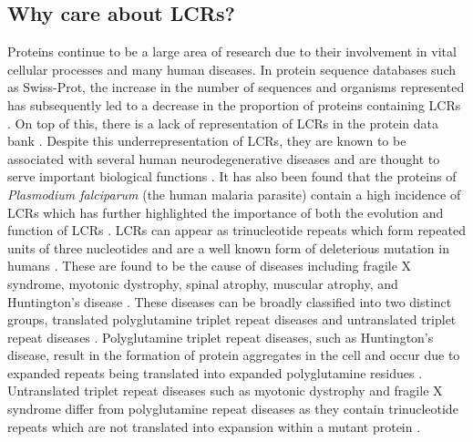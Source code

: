 \documentclass[10pt]{article}
\begin{document}
\subsection{Why care about LCRs?}
Proteins continue to be a large area of research due to their involvement in vital cellular processes and many human
diseases. In protein sequence databases such as Swiss-Prot, the increase in the number of sequences and organisms represented
has subsequently led to a decrease in the proportion of proteins containing LCRs \citep{coletta2010low}. On top of this, there
is a lack of representation of LCRs in the protein data bank \citep{huntley2002simple}. Despite this underrepresentation
of LCRs, they are known to be associated with several human neurodegenerative diseases and are thought to serve important
biological functions \citep{huntley2006selection, coletta2010low}. It has also been found that the proteins of \textit{Plasmodium
falciparum} (the human malaria parasite) contain a high incidence of LCRs which has further highlighted the importance of both
the evolution and function of LCRs \citep{gardner2002genome, depristo2006abundance}. LCRs can appear as trinucleotide repeats which
form repeated units of three nucleotides and are a well known form of deleterious mutation in humans \citep{ross1993genes}. These
are found to be the cause of diseases including fragile X syndrome, myotonic dystrophy, spinal atrophy, muscular atrophy,
and Huntington’s disease \citep{ross1993genes}. These diseases can be broadly classified into two distinct groups, translated
polyglutamine triplet repeat diseases and untranslated triplet repeat diseases \citep{everett2004trinucleotide}. Polyglutamine triplet
repeat diseases, such as Huntington’s disease, result in the formation of protein aggregates in the cell and occur due to expanded
repeats being translated into expanded polyglutamine residues \citep{everett2004trinucleotide}. Untranslated triplet repeat diseases
such as myotonic dystrophy and fragile X syndrome differ from polyglutamine repeat diseases as they contain trinucleotide
repeats which are not translated into expansion within a mutant protein \citep{everett2004trinucleotide}.
\end{document}
